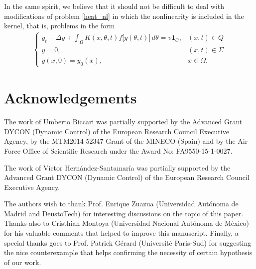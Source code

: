 \documentclass[preprint,1p]{elsarticle}
\newcommand{\D}{\displaystyle}
\begin{document}
In the same spirit, we believe that it should not be difficult to deal with modifications of problem \eqref{heat_nl} in which the nonlinearity is included in the kernel, that is, problems in the form
\begin{align*}
	\begin{cases}
		\D y_t - \Delta y + \int_\Omega K(x,\theta,t)f\big[y(\theta,t)\big]\,d\theta = v\mathbf{1}_{\mathcal O}, & (x,t)\in Q
		\\
		y = 0, & (x,t)\in\Sigma
		\\
		y(x,0) = y_0(x), & x\in\Omega.
	\end{cases}
\end{align*}

\section*{Acknowledgements} 
The work of Umberto Biccari was partially supported by the Advanced Grant DYCON (Dynamic Control) of the European Research Council Executive Agency, by the MTM2014-52347 Grant of the MINECO (Spain) and by the Air Force Office of Scientific Research under the Award No: FA9550-15-1-0027.

The work of V\'ictor Hern\'andez-Santamar\'ia was partially supported by the Advanced Grant DYCON (Dynamic Control) of the European Research Council Executive Agency.

The authors wish to thank Prof. Enrique Zuazua (Universidad Aut\'onoma de Madrid and DeustoTech) for interesting discussions on the topic of this paper. Thanks also to Cristhian Montoya (Universidad Nacional Aut\'onoma de M\'exico) for his valuable comments that helped to improve this manuscript. Finally, a special thanks goes to Prof. Patrick G\'erard (Universit\'e Paris-Sud) for suggesting the nice counterexample that helps confirming the necessity of certain hypothesis of our work.
\end{document}
